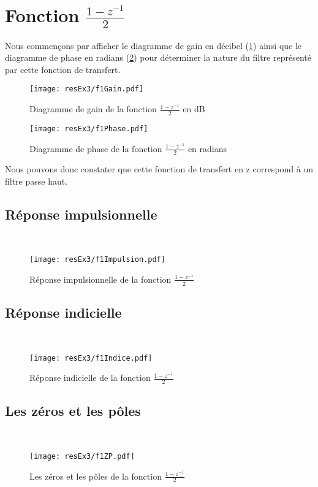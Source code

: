\section{Fonction $\frac{1-z^{-1}}{2}$}
Nous commençons par afficher le diagramme de gain en décibel (\ref{f1 Diagramme de gain}) ainsi que le diagramme de phase en radians (\ref{f1 Diagramme de phase}) pour déterminer la nature du filtre représenté par cette fonction de transfert.
\begin{figure}[H]
\centering
\texttt{[image: resEx3/f1Gain.pdf]}
\caption{Diagramme de gain de la fonction $\frac{1-z^{-1}}{2}$ en dB}
\label{f1 Diagramme de gain}
\end{figure}
\begin{figure}[H]
\centering
\texttt{[image: resEx3/f1Phase.pdf]}
\caption{Diagramme de phase de la fonction $\frac{1-z^{-1}}{2}$ en radians}
\label{f1 Diagramme de phase}
\end{figure}
Nous pouvons donc constater que cette fonction de transfert en z correspond à un filtre passe haut.
\subsection{Réponse impulsionnelle}
~\\
\begin{figure}[H]
\centering
\texttt{[image: resEx3/f1Impulsion.pdf]}
\caption{Réponse impulsionnelle de la fonction $\frac{1-z^{-1}}{2}$ }
\end{figure}
\subsection{Réponse indicielle}
~\\
\begin{figure}[H]
\centering
\texttt{[image: resEx3/f1Indice.pdf]}
\caption{Réponse indicielle de la fonction $\frac{1-z^{-1}}{2}$ }
\end{figure}

\subsection{Les zéros et les pôles}
~\\
\begin{figure}[H]
\centering
\texttt{[image: resEx3/f1ZP.pdf]}
\caption{Les zéros et les pôles de la fonction $\frac{1-z^{-1}}{2}$ }
\end{figure}


